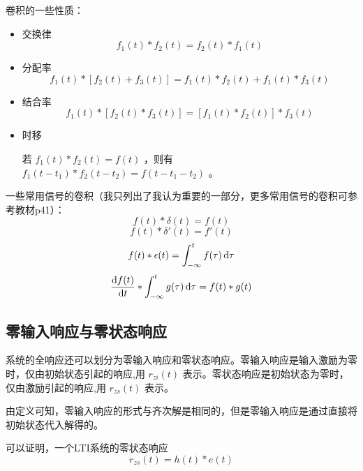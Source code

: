 \documentclass[UTF8,a4paper,11pt]{article}
\begin{document}
卷积的一些性质：
\begin{itemize}
\item 交换律
\begin{equation}
f_1(t)*f_2(t)=f_2(t)*f_1(t)
\end{equation}

\item 分配率
\begin{equation}
f_1(t)*[f_2(t)+f_3(t)]=f_1(t)*f_2(t)+f_1(t)*f_3(t)
\end{equation}

\item 结合率
\begin{equation}
f_1(t)*[f_2(t)*f_3(t)]=[f_1(t)*f_2(t)]*f_3(t)
\end{equation}

\item 时移

若 $f_1(t)*f_2(t)=f(t)$ ，则有 $f_1(t-t_1)*f_2(t-t_2)=f(t-t_1-t_2)$ 。

\end{itemize}

一些常用信号的卷积（我只列出了我认为重要的一部分，更多常用信号的卷积可参考教材p41）：
\begin{equation}
f(t)*\delta(t)=f(t)
\end{equation}
\begin{equation}
f(t)*\delta'(t)=f'(t)
\end{equation}
\begin{equation}
f(t)*\epsilon(t)=\int_{-\infty}^{t} {f(\tau)} \,{\rm d}\tau
\end{equation}
\begin{equation}
\frac{{\rm d}f(t)}{{\rm d}t}*\int_{-\infty}^{t} {g(\tau)} \,{\rm d}\tau=f(t)*g(t)
\end{equation}

\subsection{零输入响应与零状态响应}
系统的全响应还可以划分为零输入响应和零状态响应。零输入响应是输入激励为零时，仅由初始状态引起的响应,用 $r_{zi}(t)$ 表示。零状态响应是初始状态为零时，仅由激励引起的响应,用 $r_{zs}(t)$ 表示。

由定义可知，零输入响应的形式与齐次解是相同的，但是零输入响应是通过直接将初始状态代入解得的。

可以证明，一个LTI系统的零状态响应
\begin{equation}
r_{zs}(t)=h(t)*e(t)
\end{equation}
\end{document}
